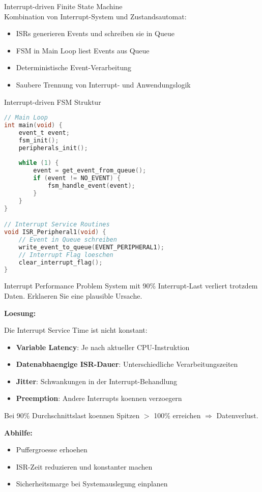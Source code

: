 \begin{concept}{Interrupt-driven Finite State Machine}\\
    Kombination von Interrupt-System und Zustandsautomat:
    \begin{itemize}
        \item ISRs generieren Events und schreiben sie in Queue
        \item FSM in Main Loop liest Events aus Queue
        \item Deterministische Event-Verarbeitung
        \item Saubere Trennung von Interrupt- und Anwendungslogik
    \end{itemize}
\end{concept}

\begin{code}{Interrupt-driven FSM Struktur}
\begin{lstlisting}[language=C, style=basesmol]
// Main Loop
int main(void) {
    event_t event;
    fsm_init();
    peripherals_init();
    
    while (1) {
        event = get_event_from_queue();
        if (event != NO_EVENT) {
            fsm_handle_event(event);
        }
    }
}

// Interrupt Service Routines
void ISR_Peripheral1(void) {
    // Event in Queue schreiben
    write_event_to_queue(EVENT_PERIPHERAL1);
    // Interrupt Flag loeschen
    clear_interrupt_flag();
}
\end{lstlisting}
\end{code}

\begin{example2}{Interrupt Performance Problem}
    System mit 90\% Interrupt-Last verliert trotzdem Daten. Erklaeren Sie eine plausible Ursache.
    
    \tcblower
    
    \textbf{Loesung:}
    
    Die Interrupt Service Time ist nicht konstant:
    \begin{itemize}
        \item \textbf{Variable Latency}: Je nach aktueller CPU-Instruktion
        \item \textbf{Datenabhaengige ISR-Dauer}: Unterschiedliche Verarbeitungszeiten
        \item \textbf{Jitter}: Schwankungen in der Interrupt-Behandlung
        \item \textbf{Preemption}: Andere Interrupts koennen verzoegern
    \end{itemize}
    
    Bei 90\% Durchschnittslast koennen Spitzen $>$ 100\% erreichen $\Rightarrow$ Datenverlust.
    
    \textbf{Abhilfe:}
    \begin{itemize}
        \item Puffergroesse erhoehen
        \item ISR-Zeit reduzieren und konstanter machen
        \item Sicherheitsmarge bei Systemauslegung einplanen
    \end{itemize}
\end{example2}

